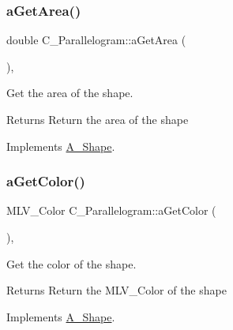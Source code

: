 \subsubsection{\texorpdfstring{a\+Get\+Area()}{aGetArea()}\hspace{0.1cm}{\footnotesize\ttfamily [2/2]}}
{\footnotesize\ttfamily double C\+\_\+\+Parallelogram\+::a\+Get\+Area (\begin{DoxyParamCaption}{ }\end{DoxyParamCaption})\hspace{0.3cm}{\ttfamily [override]}, {\ttfamily [virtual]}}



Get the area of the shape. 

\begin{DoxyReturn}{Returns}
Return the area of the shape 
\end{DoxyReturn}


Implements \hyperlink{classA__Shape_a1b142ee2d873d6c217f65de1632e7b6e}{A\+\_\+\+Shape}.

\mbox{\label{classC__Parallelogram_afd5055e948fcd992be3cdd227c8b4bfb}} 
\subsubsection{\texorpdfstring{a\+Get\+Color()}{aGetColor()}\hspace{0.1cm}{\footnotesize\ttfamily [1/2]}}
{\footnotesize\ttfamily M\+L\+V\+\_\+\+Color C\+\_\+\+Parallelogram\+::a\+Get\+Color (\begin{DoxyParamCaption}{ }\end{DoxyParamCaption})\hspace{0.3cm}{\ttfamily [override]}, {\ttfamily [virtual]}}



Get the color of the shape. 

\begin{DoxyReturn}{Returns}
Return the M\+L\+V\+\_\+\+Color of the shape 
\end{DoxyReturn}


Implements \hyperlink{classA__Shape_a1e90c8132d33e4ac84d42f72606193b2}{A\+\_\+\+Shape}.

\mbox{\label{classC__Parallelogram_afd5055e948fcd992be3cdd227c8b4bfb}} 
